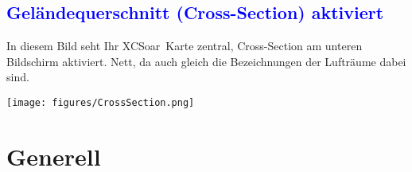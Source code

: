 \documentclass[german,a4paper,12pt]{scrreprt}
\newcommand{\xc}{{\textsf XCSoar}}
\begin{document}
\subsection*{\textcolor{blue}{Geländequerschnitt (Cross-Section) aktiviert}}
In diesem Bild seht Ihr \xc~Karte zentral, Cross-Section am unteren Bildschirm aktiviert. Nett, da auch gleich die Bezeichnungen 
der Lufträume dabei sind.
\begin{center}
 \texttt{[image: figures/CrossSection.png]}
\end{center}
\newpage\section{Generell}\label{ch:generell}
\end{document}
